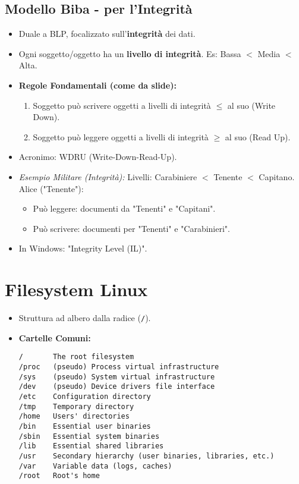 \documentclass{article}
\begin{document}
\subsection{Modello Biba - per l'Integrità}
\begin{itemize}
    \item Duale a BLP, focalizzato sull'\textbf{integrità} dei dati.
    \item Ogni soggetto/oggetto ha un \textbf{livello di integrità}. Es: Bassa $<$ Media $<$ Alta.
    \item \textbf{Regole Fondamentali (come da slide):}
    \begin{enumerate}
        \item Soggetto può scrivere oggetti a livelli di integrità $\leq$ al suo (Write Down).
        \item Soggetto può leggere oggetti a livelli di integrità $\geq$ al suo (Read Up).
    \end{enumerate}
    \item Acronimo: WDRU (Write-Down-Read-Up).
    \item \textit{Esempio Militare (Integrità):} Livelli: Carabiniere $<$ Tenente $<$ Capitano.
    Alice ("Tenente"):
    \begin{itemize}
        \item Può leggere: documenti da "Tenenti" e "Capitani".
        \item Può scrivere: documenti per "Tenenti" e "Carabinieri".
    \end{itemize}
    \item In Windows: "Integrity Level (IL)".
\end{itemize}

\section{Filesystem Linux}
\begin{itemize}
    \item Struttura ad albero dalla radice (\texttt{/}).
    \item \textbf{Cartelle Comuni:}
    \begin{verbatim}
/       The root filesystem
/proc   (pseudo) Process virtual infrastructure
/sys    (pseudo) System virtual infrastructure
/dev    (pseudo) Device drivers file interface
/etc    Configuration directory
/tmp    Temporary directory
/home   Users' directories
/bin    Essential user binaries
/sbin   Essential system binaries
/lib    Essential shared libraries
/usr    Secondary hierarchy (user binaries, libraries, etc.)
/var    Variable data (logs, caches)
/root   Root's home
    \end{verbatim}
\end{itemize}
\end{document}
